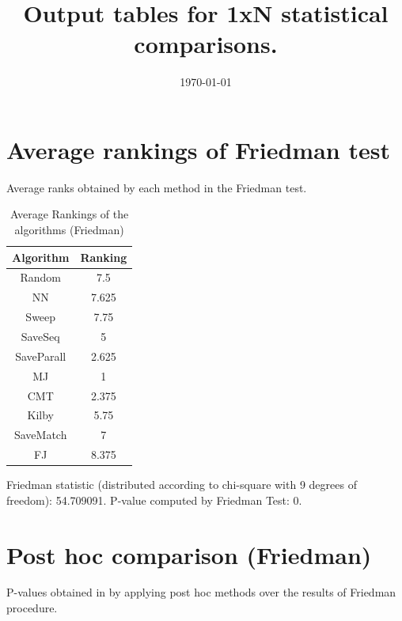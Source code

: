\documentclass[a4paper,10pt]{article}
\title{Output tables for 1xN statistical comparisons.}
\author{}
\date{\today}
\begin{document}
\begin{landscape}
\pagestyle{empty}
\maketitle
\thispagestyle{empty}

\section{Average rankings of Friedman test}


Average ranks obtained by each method in the Friedman test.

\begin{table}[!htp]
\centering
\begin{tabular}{|c|c|}\hline
Algorithm&Ranking\\\hline
Random&7.5\\NN&7.625\\Sweep&7.75\\SaveSeq&5\\SaveParall&2.625\\MJ&1\\CMT&2.375\\Kilby&5.75\\SaveMatch&7\\FJ&8.375\\\hline\end{tabular}
\caption{Average Rankings of the algorithms (Friedman)}
\end{table}

Friedman statistic (distributed according to chi-square with 9 degrees of freedom): 54.709091. \newline P-value computed by Friedman Test: 0.\newline


\newpage

\section{Post hoc comparison (Friedman)}


P-values obtained in by applying post hoc methods over the results of Friedman procedure.


\end{landscape}
\end{document}
